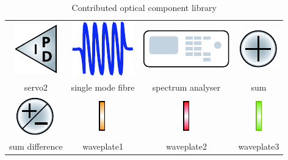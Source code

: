 \begin{table}
\begin{tabular}{|c|c|c|c|}
\includegraphics{contrib/optics_components/servo2} & 
\includegraphics{contrib/optics_components/single_mode_fibre} & 
\includegraphics{contrib/optics_components/spectrum_analyser} &
\includegraphics{contrib/optics_components/sum}\\
\tiny servo2 & 
\tiny single mode fibre & 
\tiny spectrum analyser &
\tiny sum\\
\hline

\includegraphics{contrib/optics_components/sum_difference} & 
\includegraphics{contrib/optics_components/waveplate1} &
\includegraphics{contrib/optics_components/waveplate2} &
\includegraphics{contrib/optics_components/waveplate3}\\
\tiny sum difference & 
\tiny waveplate1 &
\tiny waveplate2 &
\tiny waveplate3\\
\hline
\end{tabular}
\caption{Contributed optical component library}
\end{table}

